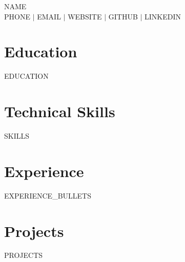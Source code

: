 \documentclass[{{FONT_SIZE}}pt,letterpaper]{extarticle}
\begin{document}
\begin{center}
  {\LARGE \textsc{{{NAME}}}} \\[{{HEADER_SKIP}}]
  {{PHONE}} $|$ {{EMAIL}} $|$ {{WEBSITE}} $|$ {{GITHUB}} $|$ {{LINKEDIN}}
\end{center}

\section{Education}
{{EDUCATION}}

\section{Technical Skills}
\begin{mdframed}[innerleftmargin=4pt,innerrightmargin=4pt,innertopmargin=2pt,innerbottommargin=2pt]
{{SKILLS}}
\end{mdframed}

\section{Experience}
{{EXPERIENCE_BULLETS}}

\section{Projects}
{{PROJECTS}}
\end{document}
